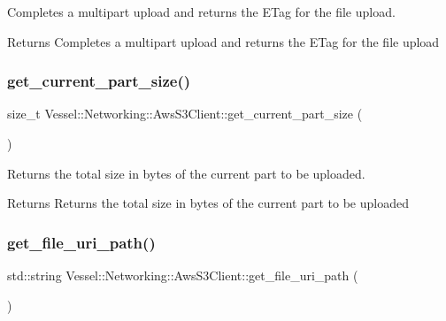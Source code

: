 Completes a multipart upload and returns the E\+Tag for the file upload. 

\begin{DoxyReturn}{Returns}
Completes a multipart upload and returns the E\+Tag for the file upload 
\end{DoxyReturn}
\mbox{\label{class_vessel_1_1_networking_1_1_aws_s3_client_ae836c56e69d9ac911f660d0c4d8d0ebc}} 
\subsubsection{\texorpdfstring{get\+\_\+current\+\_\+part\+\_\+size()}{get\_current\_part\_size()}}
{\footnotesize\ttfamily size\+\_\+t Vessel\+::\+Networking\+::\+Aws\+S3\+Client\+::get\+\_\+current\+\_\+part\+\_\+size (\begin{DoxyParamCaption}{ }\end{DoxyParamCaption})}



Returns the total size in bytes of the current part to be uploaded. 

\begin{DoxyReturn}{Returns}
Returns the total size in bytes of the current part to be uploaded 
\end{DoxyReturn}
\mbox{\label{class_vessel_1_1_networking_1_1_aws_s3_client_a00d6b781a56662ed5e80c9032fe1c380}} 
\subsubsection{\texorpdfstring{get\+\_\+file\+\_\+uri\+\_\+path()}{get\_file\_uri\_path()}}
{\footnotesize\ttfamily std\+::string Vessel\+::\+Networking\+::\+Aws\+S3\+Client\+::get\+\_\+file\+\_\+uri\+\_\+path (\begin{DoxyParamCaption}{ }\end{DoxyParamCaption})}



